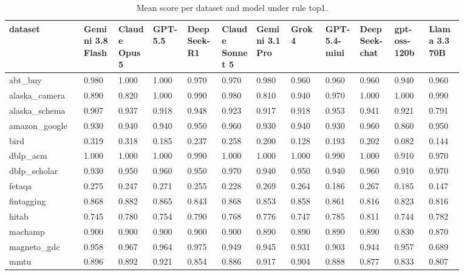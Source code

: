 \begin{landscape}
\tiny
\setlength{\tabcolsep}{3pt}
\begin{longtable}{p{0.134\linewidth}p{0.067\linewidth}p{0.067\linewidth}p{0.067\linewidth}p{0.067\linewidth}p{0.067\linewidth}p{0.067\linewidth}p{0.067\linewidth}p{0.067\linewidth}p{0.067\linewidth}p{0.067\linewidth}p{0.067\linewidth}}
\caption{Mean score per dataset and model under rule top1.}\label{tab:per_dataset_mean_top1}\\
\toprule
dataset & Gemini 3.8 Flash & Claude Opus 5 & GPT-5.5 & DeepSeek-R1 & Claude Sonnet 5 & Gemini 3.1 Pro & Grok 4 & GPT-5.4-mini & DeepSeek-chat & gpt-oss-120b & Llama 3.3 70B \\
\midrule
abt\_\allowbreak{}buy & 0.980 & 1.000 & 1.000 & 0.970 & 0.970 & 0.980 & 0.960 & 0.960 & 0.960 & 0.940 & 0.960 \\
alaska\_\allowbreak{}camera & 0.890 & 0.820 & 1.000 & 0.990 & 0.980 & 0.810 & 0.940 & 0.970 & 1.000 & 1.000 & 0.990 \\
alaska\_\allowbreak{}schema & 0.907 & 0.937 & 0.918 & 0.948 & 0.923 & 0.917 & 0.918 & 0.953 & 0.941 & 0.921 & 0.791 \\
amazon\_\allowbreak{}google & 0.930 & 0.940 & 0.940 & 0.950 & 0.960 & 0.930 & 0.940 & 0.930 & 0.960 & 0.860 & 0.950 \\
bird & 0.319 & 0.318 & 0.185 & 0.237 & 0.258 & 0.200 & 0.128 & 0.193 & 0.202 & 0.082 & 0.144 \\
dblp\_\allowbreak{}acm & 1.000 & 1.000 & 1.000 & 0.990 & 1.000 & 1.000 & 1.000 & 0.990 & 1.000 & 0.910 & 0.970 \\
dblp\_\allowbreak{}scholar & 0.930 & 0.950 & 0.960 & 0.950 & 0.970 & 0.940 & 0.950 & 0.940 & 0.960 & 0.910 & 0.970 \\
fetaqa & 0.275 & 0.247 & 0.271 & 0.255 & 0.228 & 0.269 & 0.264 & 0.186 & 0.267 & 0.185 & 0.147 \\
fintagging & 0.868 & 0.882 & 0.865 & 0.843 & 0.868 & 0.853 & 0.858 & 0.861 & 0.816 & 0.823 & 0.816 \\
hitab & 0.745 & 0.780 & 0.754 & 0.790 & 0.768 & 0.776 & 0.747 & 0.785 & 0.811 & 0.744 & 0.782 \\
machamp & 0.900 & 0.900 & 0.900 & 0.900 & 0.900 & 0.890 & 0.890 & 0.890 & 0.890 & 0.830 & 0.870 \\
magneto\_\allowbreak{}gdc & 0.958 & 0.967 & 0.964 & 0.975 & 0.949 & 0.945 & 0.931 & 0.903 & 0.944 & 0.957 & 0.689 \\
mmtu & 0.896 & 0.892 & 0.921 & 0.854 & 0.886 & 0.917 & 0.904 & 0.888 & 0.877 & 0.833 & 0.807 \\

\end{longtable}
\end{landscape}
